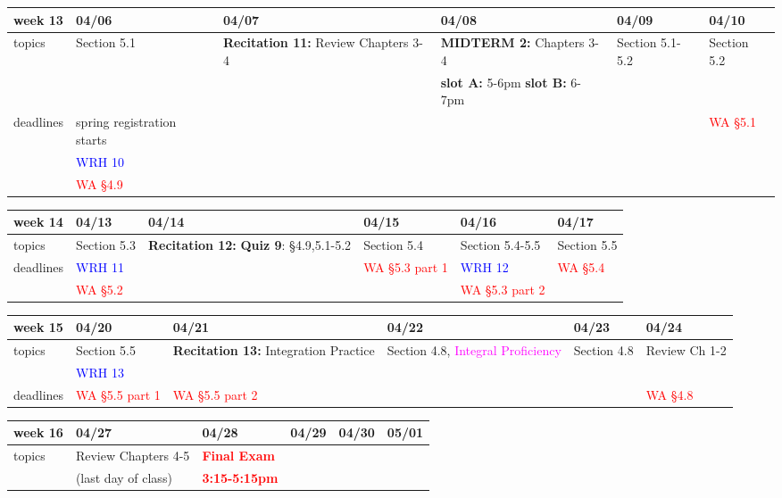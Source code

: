 \documentclass[11pt]{article}
\begin{document}
\begin{center}
\begin{tabularx}{\textwidth}{|p{1.5cm}|| L | L | L | L | L |}
\hline
week 13&04/06&04/07&04/08&04/09&04/10\\ \hline
topics &Section 5.1&\textbf{Recitation 11:} Review Chapters 3-4&\textcolor{dcyan}{\textbf{MIDTERM 2: }} Chapters 3-4&Section 5.1-5.2&Section 5.2\\ 
&&&\textcolor{ddgreen}{\textbf{slot A:} 5-6pm  \textbf{slot B:} 6-7pm}&&\\ \hline
deadlines&\textcolor{ddgreen}{spring registration starts} &&&&\textcolor{red}{WA \S 5.1} \\ 
&\textcolor{blue}{WRH 10} &&&&\\
&\textcolor{red}{WA \S 4.9}&&&& \\ \hline \end{tabularx} \end{center}

\begin{center}
\begin{tabularx}{\textwidth}{|p{1.5cm}|| L | L | L | L | L |}
\hline
week 14&04/13&04/14&04/15&04/16&04/17\\ \hline
topics &Section 5.3&\textbf{Recitation 12:}  \textbf{Quiz 9}: \S4.9,5.1-5.2&Section 5.4&Section 5.4-5.5&Section 5.5\\  \hline
deadlines&\textcolor{blue}{WRH 11} &&\textcolor{red}{WA \S 5.3 part 1}&\textcolor{blue}{WRH 12}&\textcolor{red}{WA \S 5.4} \\ 
&\textcolor{red}{WA \S 5.2}&&&\textcolor{red}{WA \S5.3 part 2}&\\ \hline \end{tabularx} \end{center}

\begin{center}
\begin{tabularx}{\textwidth}{|p{1.5cm}|| L | L | L | L | L |}
\hline
week 15&04/20&04/21&04/22&04/23&04/24\\ \hline
topics&Section 5.5&\textbf{Recitation 13:} Integration Practice &Section 4.8, \textcolor{magenta}{Integral Proficiency}&Section 4.8&Review Ch 1-2\\ \hline
&\textcolor{blue}{WRH 13}&&&&\\ 
deadlines& \textcolor{red}{WA \S 5.5 part 1}&\textcolor{red}{WA \S 5.5 part 2}&&&\textcolor{red}{WA \S 4.8} \\ \hline \end{tabularx} \end{center}

\begin{center}
\begin{tabularx}{\textwidth}{|p{1.5cm}|| L | L | L | L | L |}
\hline
week 16&04/27&04/28&04/29&04/30&05/01\\ \hline
topics&Review Chapters 4-5&\textcolor{red}{\textbf{Final Exam}} &&&\\ 
&(last day of class)&\textcolor{red}{\textbf{3:15-5:15pm}}&&&\\ \hline \hline
\end{tabularx} \end{center}
\end{document}
